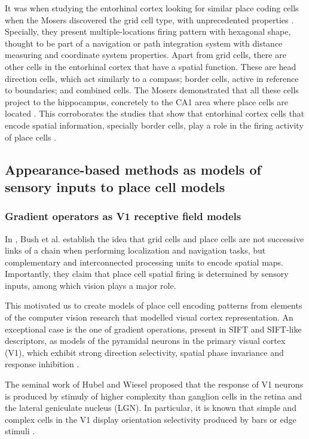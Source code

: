 It was when studying the entorhinal cortex looking for similar place coding cells when the Mosers discovered the grid cell type, with unprecedented properties \cite{hafting2005microstructure}. Specially, they present multiple-locations firing pattern with hexagonal shape, thought to be part of a navigation or path integration system with distance measuring and coordinate system properties. Apart from grid cells, there are other cells in the entorhinal cortex that have a spatial function. These are head direction cells, which act similarly to a compass; border cells, active in reference to boundaries; and combined cells. The Mosers demonstrated that all these cells project to the hippocampus, concretely to the CA1 area where place cells are located \cite{zhang2013optogenetic}. This corroborates the studies that show that entorhinal cortex cells that encode spatial information, specially	 border cells, play a role in the firing activity of place cells \cite{bush2014grid}.

\subsection{Appearance-based methods as models of sensory inputs to place cell models}

\subsubsection{Gradient operators as V1 receptive field models}

In \cite{bush2014grid}, Bush et al. establish the idea that grid cells and place cells are not successive links of a chain when performing localization and navigation tasks, but complementary and interconnected processing units to encode spatial maps. Importantly, they claim that place cell spatial firing is determined by sensory inputs, among which vision plays a major role.

This motivated us to create models of place cell encoding patterns from elements of the computer vision research that modelled visual cortex representation. An exceptional case is the one of gradient operations, present in SIFT and SIFT-like descriptors, as models of the pyramidal neurons in the primary visual cortex (V1), which exhibit strong direction selectivity, spatial phase invariance and response inhibition \cite{hubel1962receptive, dhruv2014cascaded,carandini2006simple}.

The seminal work of Hubel and Wiesel \cite{hubel1962receptive} proposed that the response of V1 neurons is produced by stimuly of higher complexity than ganglion cells in the retina and the lateral geniculate nucleus (LGN). In particular, it is known that simple and complex cells in the V1 display orientation selectivity produced by bars or edge stimuli \cite{payne2001cat}.

